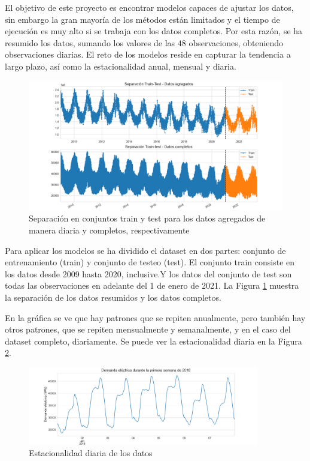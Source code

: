 \documentclass[12pt,twoside]{article}
\begin{document}
El objetivo de este proyecto es encontrar modelos capaces de ajustar los datos, sin embargo la gran mayoría de los  métodos están limitados y el tiempo de ejecución es muy alto si se trabaja con los datos completos. Por esta razón, se ha resumido los datos, sumando los valores de las $48$ observaciones, obteniendo observaciones diarias. El reto de los modelos reside en capturar la tendencia a largo plazo, así como la estacionalidad anual, mensual y diaria.
\begin{figure}[h]
\centering
    \includegraphics[width = \textwidth]{imagenes/train-test.png}
    \caption{Separación en conjuntos train y test para los datos agregados de manera diaria y completos, respectivamente}\label{train-test}
\end{figure}




Para aplicar los modelos se ha dividido el dataset en dos partes: conjunto de entrenamiento (train) y conjunto de testeo (test). El conjunto train consiste en los datos desde 2009 hasta 2020, inclusive.Y los datos del conjunto de test son todas las observaciones en adelante del 1 de enero de 2021. La Figura \ref{train-test} muestra la separación de los datos resumidos y los datos completos.


En la gráfica se ve que hay patrones que se repiten anualmente, pero también hay otros patrones, que se repiten mensualmente y semanalmente, y en el caso del dataset completo, diariamente. Se puede ver la estacionalidad diaria en la Figura \ref{fig:weekplot}.
\begin{figure}[h]
\centering
    \includegraphics[width = 0.9\textwidth]{imagenes/weekplot.png}
    \caption{Estacionalidad diaria de los datos}\label{fig:weekplot}
\end{figure}
\end{document}
